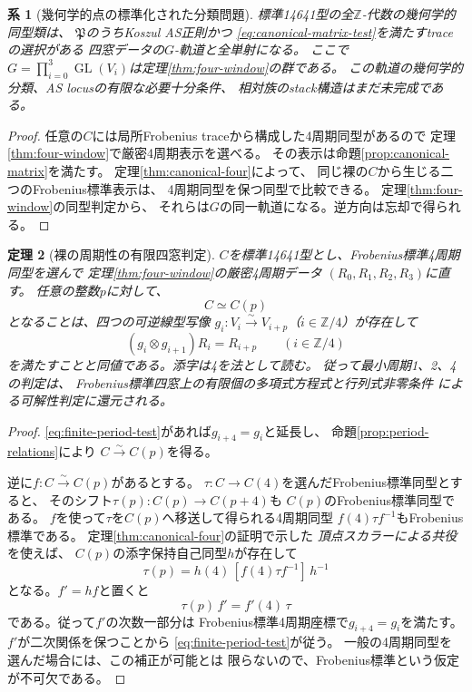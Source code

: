 \documentclass[11pt,a4paper]{ltjsarticle}
\newtheorem{theorem}{定理}[section]
\newtheorem{corollary}[theorem]{系}
\theoremstyle{definition}
\newcommand{\ZZ}{\mathbb Z}
\newcommand{\GL}{\operatorname{GL}}
\begin{document}
\begin{corollary}[幾何学的点の標準化された分類問題]\label{cor:canonical-slice}
標準14641型の全$\mathbb Z$-代数の幾何学的同型類は、
$\mathfrak P$のうち\emph{Koszul AS正則かつ}
\eqref{eq:canonical-matrix-test}を満たすtraceの選択がある
四窓データの$G$-軌道と全単射になる。
ここで$G=\prod_{i=0}^{3}\GL(V_i)$は定理\ref{thm:four-window}の群である。
この軌道の幾何学的分類、AS locusの有限な必要十分条件、
相対族のstack構造はまだ未完成である。
\end{corollary}
\begin{proof}
任意の$C$には局所Frobenius traceから構成した4周期同型があるので
定理\ref{thm:four-window}で厳密4周期表示を選べる。
その表示は命題\ref{prop:canonical-matrix}を満たす。
定理\ref{thm:canonical-four}によって、
同じ裸の$C$から生じる二つのFrobenius標準表示は、
4周期同型を保つ同型で比較できる。
定理\ref{thm:four-window}の同型判定から、
それらは$G$の同一軌道になる。逆方向は忘却で得られる。
\end{proof}

\begin{theorem}[裸の周期性の有限四窓判定]\label{thm:finite-period-test}
$C$を標準14641型とし、Frobenius標準4周期同型を選んで
定理\ref{thm:four-window}の厳密4周期データ
$(R_0,R_1,R_2,R_3)$に直す。
任意の整数$p$に対して、
\[
 C\simeq C(p)
\]
となることは、四つの可逆線型写像
$g_i:V_i\xrightarrow{\sim}V_{i+p}$（$i\in\ZZ/4$）が存在して
\begin{equation}\label{eq:finite-period-test}
 (g_i\otimes g_{i+1})R_i=R_{i+p}
 \qquad(i\in\ZZ/4)
\end{equation}
を満たすことと同値である。添字は4を法として読む。
従って最小周期1、2、4の判定は、
Frobenius標準四窓上の\emph{有限個の多項式方程式と行列式非零条件}
による可解性判定に還元される。
\end{theorem}
\begin{proof}
\eqref{eq:finite-period-test}があれば$g_{i+4}=g_i$と延長し、
命題\ref{prop:period-relations}により
$C\xrightarrow{\sim}C(p)$を得る。

逆に$f:C\xrightarrow{\sim}C(p)$があるとする。
$\tau:C\to C(4)$を選んだFrobenius標準同型とすると、
そのシフト$\tau(p):C(p)\to C(p+4)$も
$C(p)$のFrobenius標準同型である。
$f$を使って$\tau$を$C(p)$へ移送して得られる4周期同型
$f(4)\tau f^{-1}$もFrobenius標準である。
定理\ref{thm:canonical-four}の証明で示した
\emph{頂点スカラーによる共役}を使えば、
$C(p)$の添字保持自己同型$h$が存在して
\[
 \tau(p)=h(4)\,[f(4)\tau f^{-1}]\,h^{-1}
\]
となる。$f'=hf$と置くと
\[
 \tau(p)\,f'=f'(4)\,\tau
\]
である。従って$f'$の次数一部分は
Frobenius標準4周期座標で$g_{i+4}=g_i$を満たす。
$f'$が二次関係を保つことから
\eqref{eq:finite-period-test}が従う。
一般の4周期同型を選んだ場合には、この補正が可能とは
限らないので、Frobenius標準という仮定が不可欠である。
\end{proof}
\end{document}
